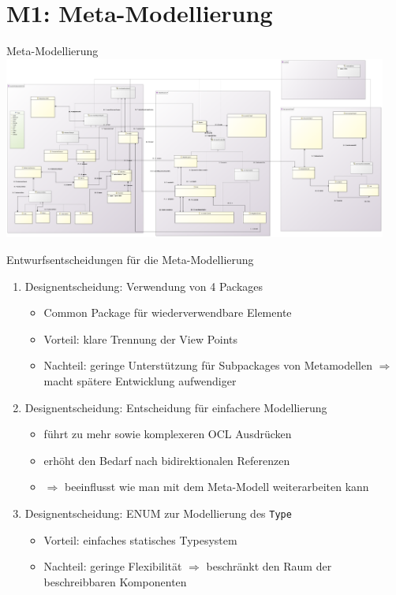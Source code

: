 \section[M1: Metamodell]{M1: Meta-Modellierung}
\begin{frame}{Meta-Modellierung}
	\centering
	\includegraphics[height=60mm]{figures/meta-modell.png}
\end{frame}

\begin{frame}{Entwurfsentscheidungen für die Meta-Modellierung}
	\begin{enumerate}
		\item Designentscheidung: Verwendung von 4 Packages
		\begin{itemize}
			\item Common Package für wiederverwendbare Elemente
			\item Vorteil: klare Trennung der View Points
			\item Nachteil: geringe Unterstützung für Subpackages von Metamodellen $\Rightarrow$ macht spätere Entwicklung aufwendiger
		\end{itemize}
		\item Designentscheidung: Entscheidung für einfachere Modellierung
		\begin{itemize}
			\item führt zu mehr sowie komplexeren OCL Ausdrücken
			\item erhöht den Bedarf nach bidirektionalen Referenzen
			\item $\Rightarrow$ beeinflusst wie man mit dem Meta-Modell weiterarbeiten kann
		\end{itemize}
		\item Designentscheidung: ENUM zur Modellierung des \texttt{Type}
		\begin{itemize}
			\item Vorteil: einfaches statisches Typesystem
			\item Nachteil: geringe Flexibilität $\Rightarrow$ beschränkt den Raum der beschreibbaren Komponenten
		\end{itemize}
	\end{enumerate}
\end{frame}

